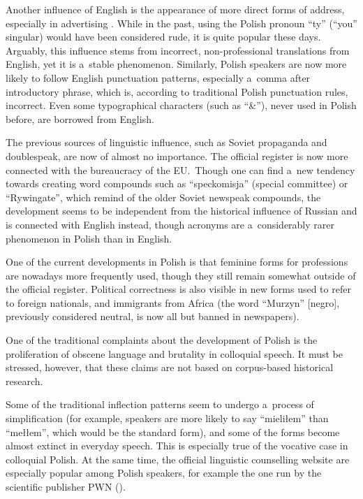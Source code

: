 \begin{multicols}{2}

Another influence of English is the appearance of more direct forms of
address, especially in advertising \cite{Chlopicki2000}. While in the
past, using the Polish pronoun “ty” (“you” singular) would
have been considered rude, it is quite popular these days. Arguably,
this influence stems from incorrect, non-professional translations
from English, yet it is a~stable phenomenon. Similarly, Polish
speakers are now more likely to follow English punctuation patterns,
especially a~comma after introductory phrase, which is, according to
traditional Polish punctuation rules, incorrect. Even some
typographical characters (such as “\&”), never used in Polish
before, are borrowed from English. 

The previous sources of linguistic influence, such as Soviet
propaganda and doublespeak, are now of almost no importance. The
official register is now more connected with the bureaucracy of the
EU.~Though one can find a~new tendency towards creating word compounds
such as “speckomisja” (special committee) or “Rywingate”,
which remind of the older Soviet newspeak compounds, the development
seems to be independent from the historical influence of Russian and
is connected with English instead, though acronyms are a~considerably
rarer phenomenon in Polish than in English. 


One of the current developments in Polish is that feminine forms for
professions are nowadays more frequently used, though they still
remain somewhat outside of the official register. Political
correctness is also visible in new forms used to refer to foreign
nationals, and immigrants from Africa (the word “Murzyn” [negro],
previously considered neutral, is now all but banned in newspapers). 

One of the traditional complaints about the development of Polish is
the proliferation of obscene language and brutality in colloquial
speech. It must be stressed, however, that these claims are not based
on corpus-based historical research. 

Some of the traditional inflection patterns seem to undergo a~process
of simplification (for example, speakers are more likely to say
“mieliłem” than “mełłem”, which would be the standard
form), and some of the forms become almost extinct in everyday speech.
This is especially true of the vocative case in colloquial Polish. At
the same time, the official linguistic counselling website are
especially popular among Polish speakers, for example the one run by
the scientific publisher PWN (\cite{poradniapwn}). 


\end{multicols}
